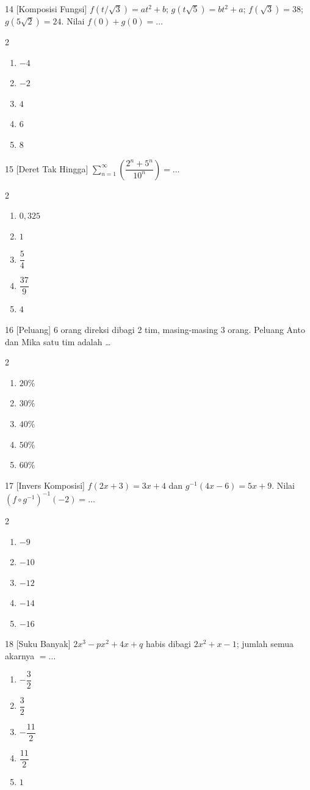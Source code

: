 \documentclass[11pt]{article}
\newenvironment{pil}{%
  \begin{enumerate}[label=(\alph*),leftmargin=*,itemsep=1pt,topsep=3pt]}%
  {\end{enumerate}}
\newenvironment{pilB}{%
  \par\smallskip\begin{multicols}{2}
  \begin{enumerate}[label=(\alph*),leftmargin=*,itemsep=1pt,topsep=3pt]}%
  {\end{enumerate}\end{multicols}}
\begin{document}
\begin{soal}{14 \normalfont\small[Komposisi Fungsi]}
$f(t/\sqrt3)=at^2+b$; $g(t\sqrt5)=bt^2+a$; $f(\sqrt3)=38$; $g(5\sqrt2)=24$.
Nilai $f(0)+g(0)=\ldots$
\begin{pilB}
  \item $-4$ \item $-2$ \item $4$ \item $6$ \item $8$
\end{pilB}
\end{soal}

\begin{soal}{15 \normalfont\small[Deret Tak Hingga]}
$\displaystyle\sum_{n=1}^\infty\left(\dfrac{2^n+5^n}{10^n}\right)=\ldots$
\begin{pilB}
  \item $0{,}325$ \item $1$ \item $\dfrac54$ \item $\dfrac{37}{9}$ \item $4$
\end{pilB}
\end{soal}

\begin{soal}{16 \normalfont\small[Peluang]}
6 orang direksi dibagi 2 tim, masing-masing 3 orang. Peluang Anto dan Mika satu tim adalah \ldots
\begin{pilB}
  \item $20\%$ \item $30\%$ \item $40\%$ \item $50\%$ \item $60\%$
\end{pilB}
\end{soal}

\begin{soal}{17 \normalfont\small[Invers Komposisi]}
$f(2x+3)=3x+4$ dan $g^{-1}(4x-6)=5x+9$.
Nilai $(f\circ g^{-1})^{-1}(-2)=\ldots$
\begin{pilB}
  \item $-9$ \item $-10$ \item $-12$ \item $-14$ \item $-16$
\end{pilB}
\end{soal}

\begin{soal}{18 \normalfont\small[Suku Banyak]}
$2x^3-px^2+4x+q$ habis dibagi $2x^2+x-1$; jumlah semua akarnya $=\ldots$
\begin{pil}
  \item $-\dfrac32$ \item $\dfrac32$ \item $-\dfrac{11}{2}$ \item $\dfrac{11}{2}$ \item $1$
\end{pil}
\end{soal}
\end{document}
